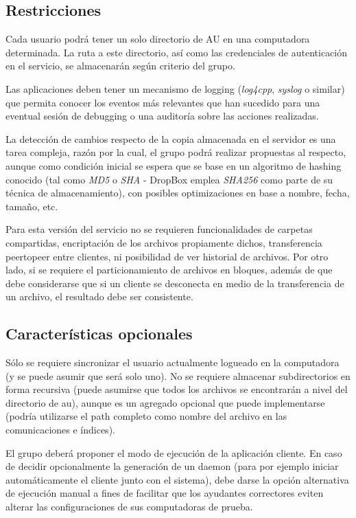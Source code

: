 \documentclass{article}
\begin{document}
\subsection{Restricciones}
\smallskip

	Cada usuario podrá tener un solo directorio de AU en una computadora determinada. La ruta a este directorio, así como las credenciales de autenticación en el servicio, se almacenarán según criterio del grupo.
	\par
	Las aplicaciones deben tener un mecanismo de logging (\textit{log4cpp}, \textit{syslog} o similar) que permita conocer los eventos más relevantes que han sucedido para una eventual sesión de debugging o una auditoría sobre las acciones realizadas.
	\par
	La detección de cambios respecto de la copia almacenada en el servidor es una tarea compleja, razón por la cual, el grupo podrá realizar propuestas al respecto, aunque como condición inicial se espera que se base en un algoritmo de hashing conocido (tal como \textit{MD5} o \textit{SHA} -  DropBox emplea \textit{SHA256} como parte de su técnica de almacenamiento), con posibles optimizaciones en base a nombre, fecha, tamaño, etc.
	\par
	Para esta versión del servicio no se requieren funcionalidades de carpetas compartidas, encriptación de los archivos propiamente dichos, transferencia peertopeer entre clientes, ni posibilidad de ver historial de archivos. Por otro lado, si se requiere el particionamiento de archivos en bloques, además de que debe considerarse que si un cliente se desconecta en medio de la transferencia de un archivo, el resultado debe ser consistente.
\bigskip



\subsection{Características opcionales}
\smallskip

	Sólo se requiere sincronizar el usuario actualmente logueado en la computadora (y se puede asumir que será solo uno). No se requiere almacenar subdirectorios en forma recursiva (puede asumirse que todos los archivos se encontrarán a nivel del directorio de au), aunque es un agregado opcional que puede implementarse (podría utilizarse el path completo como nombre del archivo en las comunicaciones e índices).
	\par
	El grupo deberá proponer el modo de ejecución de la aplicación cliente. En caso de decidir opcionalmente la generación de un daemon (para por ejemplo iniciar automáticamente el cliente junto con el sistema), debe darse la opción alternativa de ejecución manual a fines de facilitar que los ayudantes correctores eviten alterar las configuraciones de sus computadoras de prueba.
\bigskip
\end{document}

